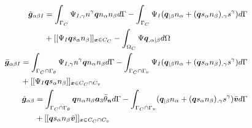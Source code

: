 \begin{subequations}\label{gm}
\begin{align}
\small
\begin{split}
\tilde{\boldsymbol g}_{\alpha\beta I} &= \int_{\Gamma_C} \Psi_{I,\gamma}n^\gamma \boldsymbol q n_\alpha n_\beta d\Gamma 
- \int_{\Gamma_C} \Psi_I(\boldsymbol q_{\vert \beta} n_\alpha + (\boldsymbol q s_\alpha n_\beta)_{,\gamma}s^\gamma) d\Gamma \\
&+ [[\Psi_I \boldsymbol q s_\alpha n_\beta]]_{\boldsymbol x\in C_C}
- \int_{\Omega_C} \Psi \boldsymbol q_{,\alpha\vert \beta} d\Omega \\
\end{split} \\
\small
\begin{split}
\bar{\boldsymbol g}_{\alpha\beta I} &= \int_{\Gamma_C\cap\Gamma_\theta} \Psi_{I,\gamma}n^\gamma \boldsymbol q n_\alpha n_\beta d\Gamma 
- \int_{\Gamma_C\cap\Gamma_v} \Psi_I(\boldsymbol q_{\vert \beta} n_\alpha + (\boldsymbol q s_\alpha n_\beta)_{,\gamma}s^\gamma) d\Gamma \\
&+ [[\Psi_I \boldsymbol q s_\alpha n_\beta]]_{\boldsymbol x\in C_C\cap C_v}
\end{split} \\
\small
\begin{split}
\hat{\boldsymbol g}_{\alpha\beta} &= \int_{\Gamma_C\cap\Gamma_\theta} \boldsymbol q n_\alpha n_\beta \boldsymbol a_3 \bar{\theta}_{\boldsymbol n} d\Gamma 
- \int_{\Gamma_C\cap\Gamma_v}(\boldsymbol q_{\vert \beta} n_\alpha + (\boldsymbol q s_\alpha n_\beta)_{,\gamma}s^\gamma)\bar{\boldsymbol v} d\Gamma \\
&+ [[\boldsymbol q s_\alpha n_\beta \bar{\boldsymbol v}]]_{\boldsymbol x\in C_C\cap C_v}
\end{split}
\end{align}
\end{subequations}
